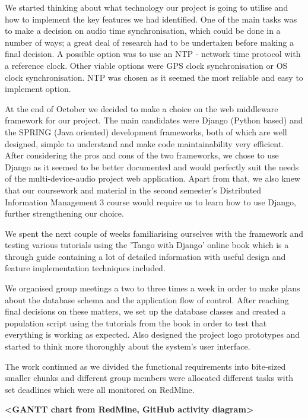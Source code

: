 \documentclass{l3proj}
\begin{document}
We started thinking about what technology our project is going to utilise and how to implement the key features we had identified. One of the main tasks was to make a decision on audio time synchronisation, which could be done in a number of ways; a great deal of research had to be undertaken before making a final decision. A possible option was to use an NTP - network time protocol with a reference clock. Other viable options were GPS clock synchronisation or OS clock synchronisation. NTP was chosen as it seemed the most reliable and easy to implement option.

At the end of October we decided to make a choice on the web middleware framework for our project. The main candidates were Django (Python based) and the SPRING (Java oriented) development frameworks, both of which are well designed, simple to understand and make code maintainability very efficient. After considering the pros and cons of the two frameworks, we chose to use Django as it seemed to be better documented and would perfectly suit the needs of the multi-device-audio project web application. Apart from that, we also knew that our coursework and material in the second semester’s Distributed Information Management 3 course would require us to learn how to use Django, further strengthening our choice.

We spent the next couple of weeks familiarising ourselves with the framework and testing various tutorials using the 'Tango with Django' online book which is a through guide containing a lot of detailed information with useful design and feature implementation techniques included.

We organised group meetings a two to three times a week in order to make plans about the database schema and the application flow of control. After reaching final decisions on these matters, we set up the database classes and created a population script using the tutorials from the book in order to test that everything is working as expected. Also designed the project logo prototypes and started to think more thoroughly about the system’s user interface.

The work continued as we divided the functional requirements into bite-sized smaller chunks and different group members were allocated different tasks with set deadlines which were all monitored on RedMine.

\textbf{<GANTT chart from RedMine, GitHub activity diagram>}




\end{document}
